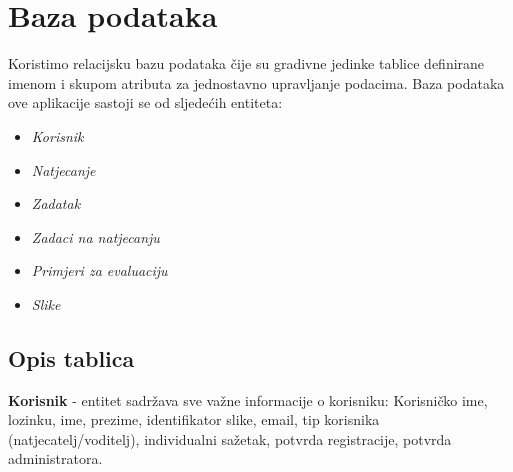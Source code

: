 				
		\section{Baza podataka}
			

			
		{Koristimo relacijsku bazu podataka čije su gradivne jedinke tablice definirane imenom i skupom atributa za jednostavno upravljanje podacima. Baza podataka ove aplikacije sastoji se od sljedećih entiteta:}
	\begin{itemize}
		\item 	\textit{Korisnik}
		\item 	\textit{Natjecanje}
		\item 	\textit{Zadatak}
		\item 	\textit{Zadaci na natjecanju}
		\item 	\textit{Primjeri za evaluaciju}	
		\item 	\textit{Slike}		
	\end{itemize}
		
			\subsection{Opis tablica}
			

				{\textbf{Korisnik} - entitet sadržava sve važne informacije o korisniku: Korisničko ime, lozinku, ime, prezime, identifikator slike, email, tip korisnika (natjecatelj/voditelj), individualni sažetak, potvrda registracije, potvrda administratora. }
				
